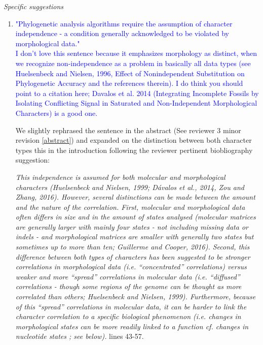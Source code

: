\documentclass[12pt,letterpaper]{article}
\renewcommand{\subsection}[1]{%
\bigskip
\begin{center}
\begin{large}
\normalfont\itshape #1
\end{large}
\end{center}}
\begin{document}
\subsection{Specific suggestions}

\begin{enumerate}

\item{\textcolor{blue}{"Phylogenetic analysis algorithms require the assumption of character independence - a condition generally acknowledged to be violated by morphological data."\\
I don't love this sentence because it emphasizes morphology as distinct, when we recognize non-independence as a problem in basically all data types (see Huelsenbeck and Nielsen, 1996, Effect of Nonindependent Substitution on Phylogenetic Accuracy and the references therein). I do think you should point to a citation here; Davalos et al. 2014 (Integrating Incomplete Fossils by Isolating Conflicting Signal in Saturated and Non-Independent Morphological Characters) is a good one.}}
\label{molecular}

We slightly rephrased the sentence in the abstract (See reviewer 3 minor revision \ref{abstract}) and expanded on the distinction between both character types this in the introduction following the reviewer pertinent biobliography suggestion:

\textit{This independence is assumed for both molecular and morphological characters (Huelsenbeck and Nielsen, 1999; D\'{a}valos et al., 2014, Zou and Zhang, 2016).
However, several distinctions can be made between the amount and the nature of the correlation.
First, molecular and morphological data often differs in size and in the amount of states analysed (molecular matrices are generally larger with mainly four states - not including missing data or indels - and morphological matrices are smaller with generally two states but sometimes up to more than ten; Guillerme and Cooper, 2016).
Second, this difference between both types of characters has been suggested to be stronger correlations in morphological data (i.e. ``concentrated'' correlations) \textit{versus} weaker and more ``spread'' correlations in molecular data (i.e. ``diffused'' correlations - though some regions of the genome can be thought as more correlated than others; Huelsenbeck and Nielsen, 1999).
Furthermore, because of this ``spread'' correlations in molecular data, it can be harder to link the character correlation to a specific biological phenomenon (i.e. changes in morphological states can be more readily linked to a function cf. changes in nucleotide states ; see below).} lines 43-57.


\end{enumerate}
\end{document}
